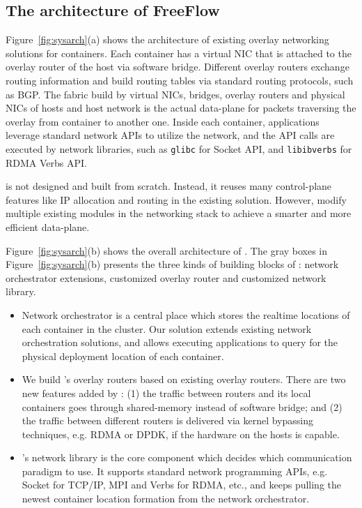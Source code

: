 \subsection{The architecture of FreeFlow}

Figure~\ref{fig:sysarch}(a) shows the architecture of existing overlay networking
solutions for containers. Each container has a virtual NIC that is attached to
the overlay router of the host via software bridge. Different overlay routers
exchange routing information and build routing tables via standard routing 
protocols, such as BGP. The fabric build by virtual NICs, bridges, overlay routers and physical NICs of hosts and host network is the actual data-plane for
packets traversing the overlay from container to another one. Inside each container, applications leverage standard network APIs to utilize the network, and the API calls are executed by network libraries, such as \texttt{glibc} for Socket API, and \texttt{libibverbs} for RDMA Verbs API.

\sysname is not designed and built from scratch. Instead, it reuses many
control-plane features like IP allocation and routing in the existing solution.
However, \sysname modify multiple existing modules in the networking stack
to achieve a smarter and more efficient data-plane.

Figure~\ref{fig:sysarch}(b) shows the overall architecture of \sysname.
The gray boxes in Figure~\ref{fig:sysarch}(b) presents the three kinds of
building blocks of \sysname: network orchestrator extensions, customized overlay router and
customized network library.
\begin{itemize}

\item Network orchestrator is a central place which stores the
  realtime locations of each container in the cluster. Our solution
  extends existing network orchestration solutions, and allows
  executing applications to query for the physical deployment location
  of each container.

\item We build \sysname's overlay routers based
on existing overlay routers. There are two new features added by \sysname:
(1) the traffic between routers and its local containers goes through shared-memory instead of software bridge; and (2) the traffic between different
routers is delivered via kernel bypassing techniques, e.g. RDMA or DPDK, if
the hardware on the hosts is capable.

\item \sysname's network library is the core component which decides which
communication paradigm to use. It supports standard network programming APIs,
e.g. Socket for TCP/IP, MPI and Verbs for RDMA, etc., and keeps pulling
the newest container location formation from the network orchestrator. 


\end{itemize} 

